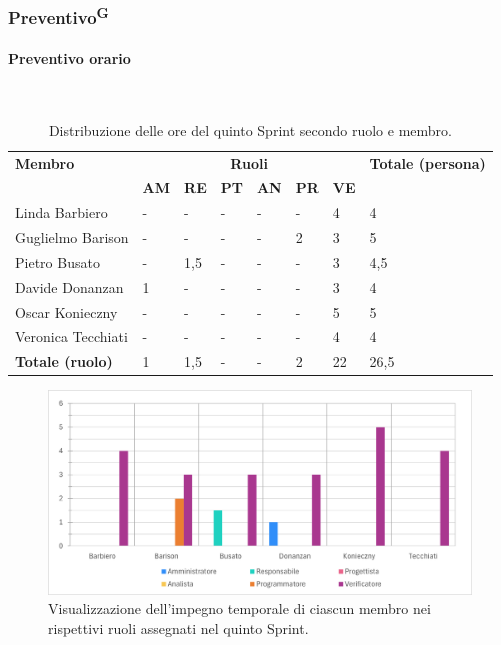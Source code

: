 \documentclass[8pt]{article}
\newcommand{\glossterm}[1]{#1\textsuperscript{G}} %
\newcommand{\subsubsubsection}[1]{\paragraph{#1}\mbox{}\\}
\begin{document}
\subsubsection{\glossterm{Preventivo}}
\subsubsubsection{Preventivo orario}
\begin{table}[ht!]
	\centering
	\begin{tabular}{p{4cm} p{1cm} p{1cm} p{1cm} p{1cm} p{1cm} p{1cm} p{3cm}}
		\toprule
        \textbf{Membro} & \multicolumn{6}{c}{\textbf{Ruoli}} & \textbf{Totale (persona)}\\
		& \textbf{AM} & \textbf{RE} & \textbf{PT} & \textbf{AN} & \textbf{PR} & \textbf{VE}\\
		\midrule
        Linda Barbiero          & -     & -     & -     & -     & -     & 4     & 4 \\
        Guglielmo Barison       & -     & -     & -     & -     & 2     & 3     & 5\\
        Pietro Busato           & -     & 1,5   & -     & -     & -     & 3     & 4,5 \\
        Davide Donanzan         & 1     & -     & -     & -     & -     & 3     & 4 \\
        Oscar Konieczny         & -     & -     & -     & -     & -     & 5     & 5 \\
        Veronica Tecchiati      & -     & -     & -     & -     & -     & 4     & 4 \\
        \bottomrule
        \textbf{Totale (ruolo)} & 1     & 1,5   & -    & -      & 2  & 22   & 26,5 \\
	\end{tabular}
	\caption{Distribuzione delle ore del quinto Sprint secondo ruolo e membro.}
	\label{table:Distribuzione delle ore del quinto Sprint secondo ruolo e membro}
\end{table}
\begin{figure}[ht!]
    \centering
    \includegraphics[width=15cm]{./images_pdp/istogramma_periodo_5.png}
    \caption{Visualizzazione dell'impegno temporale di ciascun membro nei rispettivi ruoli assegnati
    nel quinto Sprint.}
    \label{figure:Visualizzazione dell'impegno temporale di ciascun membro nei rispettivi ruoli
    assegnati nel quinto Sprint}
\end{figure}
\end{document}
